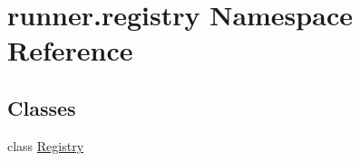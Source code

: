\hypertarget{namespacerunner_1_1registry}{}\section{runner.\+registry Namespace Reference}
\label{namespacerunner_1_1registry}
\subsection*{Classes}
\begin{DoxyCompactItemize}
\item 
class \hyperlink{classrunner_1_1registry_1_1Registry}{Registry}
\end{DoxyCompactItemize}
